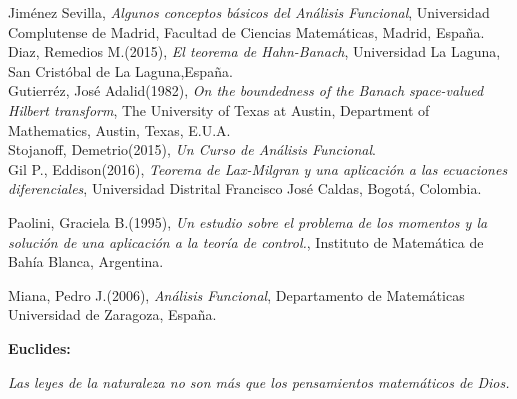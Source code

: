 \documentclass[10pt]{amsart}
\theoremstyle{remark}
\numberwithin{equation}{section}
\begin{document}
\begin{thebibliography}{20}
Jiménez Sevilla, \textit{Algunos conceptos básicos del Análisis Funcional}, Universidad Complutense de Madrid, Facultad de Ciencias Matemáticas, Madrid, España.\\

Diaz, Remedios M.(2015), \textit{El teorema de Hahn-Banach}, Universidad La Laguna, San Cristóbal de La Laguna,España.\\

Gutierréz, José Adalid(1982), \textit{On the boundedness of the Banach space-valued Hilbert transform}, The University of Texas at Austin, Department of Mathematics, Austin, Texas, E.U.A.\\

Stojanoff, Demetrio(2015), \textit{Un Curso de Análisis Funcional}. \\

Gil P., Eddison(2016), \textit{Teorema de Lax-Milgran y una aplicación a las ecuaciones diferenciales}, Universidad Distrital Francisco José Caldas, Bogotá, Colombia.

Paolini, Graciela B.(1995), \textit{Un estudio sobre el problema de los momentos y la solución de una aplicación a la teoría de control.}, Instituto de Matemática de Bahía Blanca, Argentina.

Miana, Pedro J.(2006), \textit{Análisis Funcional}, Departamento de Matemáticas
Universidad de Zaragoza, España.

\end{thebibliography}

\newpage
\thispagestyle{empty}

\textbf{Euclides:\\}
\begin{center}
	\textit{Las leyes de la naturaleza no son más que los pensamientos matemáticos de Dios.}
	\vspace*{17cm}
\end{center}
\end{document}

